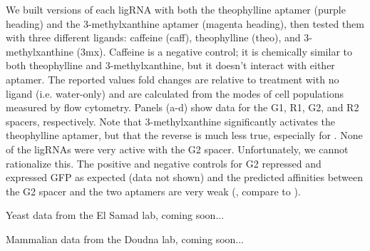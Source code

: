 \documentclass[10pt,oneside]{article}
\begin{document}
    We built versions of each ligRNA with both the theophylline aptamer (purple heading) and the 3-methylxanthine aptamer (magenta heading), then tested them with three different ligands: caffeine (caff), theophylline (theo), and 3-methylxanthine (3mx).  Caffeine is a negative control; it is chemically similar to both theophylline and 3-methylxanthine, but it doesn't interact with either aptamer.  The reported values fold changes are relative to treatment with no ligand (i.e. water-only) and are calculated from the modes of cell populations measured by flow cytometry.  Panels (a-d) show data for the G1, R1, G2, and R2 spacers, respectively.  Note that 3-methylxanthine significantly activates the theophylline aptamer, but that the reverse is much less true, especially for \ligrnaB{}.  None of the ligRNAs were very active with the G2 spacer.  Unfortunately, we cannot rationalize this.  The positive and negative controls for G2 repressed and expressed GFP as expected (data not shown) and the predicted affinities between the G2 spacer and the two aptamers are very weak (, compare to ).


    Yeast data from the El Samad lab, coming soon...


    Mammalian data from the Doudna lab, coming soon...

\printbibliography[title=References]
\end{document}

